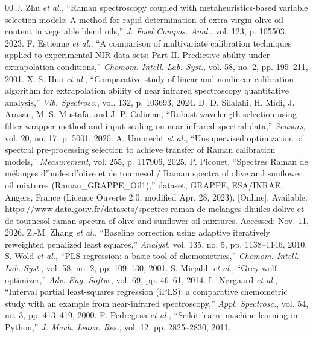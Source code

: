 \documentclass[conference]{IEEEtran}
\begin{document}
{\footnotesize
\begin{thebibliography}{00}
 J. Zhu \textit{et al.}, ``Raman spectroscopy coupled with metaheuristics-based variable selection models: A method for rapid determination of extra virgin olive oil content in vegetable blend oils,'' \textit{J. Food Compos. Anal.}, vol. 123, p. 105503, 2023.
 F. Estienne \textit{et al.}, ``A comparison of multivariate calibration techniques applied to experimental NIR data sets: Part II. Predictive ability under extrapolation conditions,'' \textit{Chemom. Intell. Lab. Syst.}, vol. 58, no. 2, pp. 195--211, 2001.
 X.-S. Huo \textit{et al.}, ``Comparative study of linear and nonlinear calibration algorithm for extrapolation ability of near infrared spectroscopy quantitative analysis,'' \textit{Vib. Spectrosc.}, vol. 132, p. 103693, 2024.
 D. D. Silalahi, H. Midi, J. Arasan, M. S. Mustafa, and J.-P. Caliman, ``Robust wavelength selection using filter-wrapper method and input scaling on near infrared spectral data,'' \textit{Sensors}, vol. 20, no. 17, p. 5001, 2020.
 A. Umprecht \textit{et al.}, ``Unsupervised optimization of spectral pre-processing selection to achieve transfer of Raman calibration models,'' \textit{Measurement}, vol. 255, p. 117906, 2025.
 P. Picouet, ``Spectres Raman de m\'elanges d'huiles d'olive et de tournesol / Raman spectra of olive and sunflower oil mixtures (Raman\_GRAPPE\_Oil1),'' dataset, GRAPPE, ESA/INRAE, Angers, France (Licence Ouverte 2.0; modified Apr. 28, 2023). [Online]. Available: \url{https://www.data.gouv.fr/datasets/spectres-raman-de-melanges-dhuiles-dolive-et-de-tournesol-raman-spectra-of-olive-and-sunflower-oil-mixtures}. Accessed: Nov. 11, 2026.
 Z.-M. Zhang \textit{et al.}, ``Baseline correction using adaptive iteratively reweighted penalized least squares,'' \textit{Analyst}, vol. 135, no. 5, pp. 1138--1146, 2010.
 S. Wold \textit{et al.}, ``PLS-regression: a basic tool of chemometrics,'' \textit{Chemom. Intell. Lab. Syst.}, vol. 58, no. 2, pp. 109--130, 2001.
 S. Mirjalili \textit{et al.}, ``Grey wolf optimizer,'' \textit{Adv. Eng. Softw.}, vol. 69, pp. 46--61, 2014.
 L. N{\o}rgaard \textit{et al.}, ``Interval partial least-squares regression (iPLS): a comparative chemometric study with an example from near-infrared spectroscopy,'' \textit{Appl. Spectrosc.}, vol. 54, no. 3, pp. 413--419, 2000.
 F. Pedregosa \textit{et al.}, ``Scikit-learn: machine learning in Python,'' \textit{J. Mach. Learn. Res.}, vol. 12, pp. 2825--2830, 2011.
\end{thebibliography}
}
\end{document}
